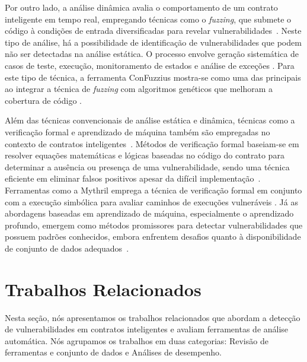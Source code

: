\documentclass[12pt]{article}
\begin{document}
Por outro lado, a análise dinâmica avalia o comportamento de um contrato inteligente em tempo real, empregando técnicas como o \textit{fuzzing}, que submete o código à condições de entrada diversificadas para revelar vulnerabilidades~\cite{rameder2022review}. Neste tipo de análise, há a possibilidade de identificação de vulnerabilidades que podem não ser detectadas na análise estática. O processo envolve geração sistemática de casos de teste, execução, monitoramento de estados e análise de exceções \cite{li2023review}. Para este tipo de técnica, a ferramenta ConFuzzius mostra-se como uma das principais ao integrar a técnica de \textit{fuzzing} com algoritmos genéticos que melhoram a cobertura de código \cite{9581164}.


Além das técnicas convencionais de análise estática e dinâmica, técnicas como a verificação formal e aprendizado de máquina também são empregadas no contexto de contratos inteligentes~\cite{10833642}. Métodos de verificação formal baseiam-se em resolver equações matemáticas e lógicas baseadas no código do contrato para determinar a ausência ou presença de uma vulnerabilidade, sendo uma técnica eficiente em eliminar falsos positivos apesar da difícil implementação~\cite{almakhour2020verification}. Ferramentas como a Mythril emprega a técnica de verificação formal em conjunto com a execução simbólica para avaliar caminhos de execuções vulneráveis \cite{mythril2018}. Já as abordagens baseadas em aprendizado de máquina, especialmente o aprendizado profundo, emergem como métodos promissores para detectar vulnerabilidades que possuem padrões conhecidos, embora enfrentem desafios quanto à disponibilidade de conjunto de dados adequados~\cite{qian2022smart, rameder2022review}.

\section{Trabalhos Relacionados}\label{sec:relatedwork}

Nesta seção, nós apresentamos os trabalhos relacionados que abordam a detecção de vulnerabilidades em contratos inteligentes e avaliam ferramentas de análise automática. Nós agrupamos os trabalhos em duas categorias: Revisão de ferramentas e conjunto de dados e Análises de desempenho.
\end{document}
